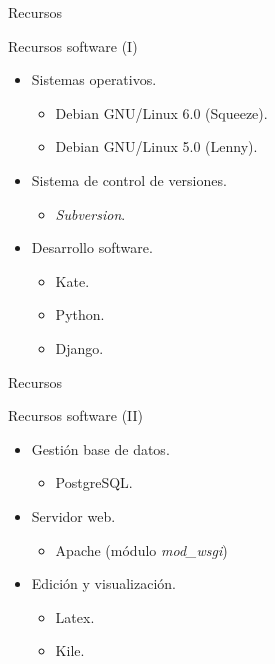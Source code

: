 \documentclass[10pt, hyperref={pdfpagelabels=false}]{beamer}
\begin{document}
      \begin{frame}{Recursos}
        \begin{block}{Recursos software (I)}
          \begin{itemize}
           \item Sistemas operativos.
           \begin{itemize}
            \item Debian GNU/Linux 6.0 (Squeeze).
            \item Debian GNU/Linux 5.0 (Lenny).
           \end{itemize}
           \item Sistema de control de versiones.
           \begin{itemize}
            \item \textit{Subversion}.
           \end{itemize}
           \item Desarrollo software.
           \begin{itemize}
            \item Kate.
            \item Python.
            \item Django.
           \end{itemize}
          \end{itemize}
        \end{block}
      \end{frame}

      \begin{frame}{Recursos}
        \begin{block}{Recursos software (II)}
          \begin{itemize}
           \item Gestión base de datos.
           \begin{itemize}
            \item PostgreSQL.
           \end{itemize}
           \item Servidor web.
           \begin{itemize}
            \item Apache (módulo \textit{mod\_wsgi})
           \end{itemize}
           \item Edición y visualización.
           \begin{itemize}
            \item Latex.
            \item Kile.
           \end{itemize}
          \end{itemize}
        \end{block}
      \end{frame}
\end{document}
